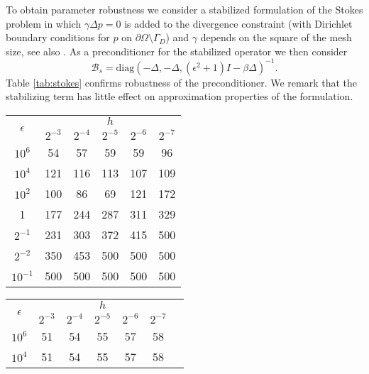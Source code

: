 \begin{example}
  To obtain parameter robustness we consider a stabilized formulation
  of the Stokes problem in which $\gamma \Delta p = 0$ is added to the
  divergence constraint (with Dirichlet boundary conditions for $p$ on
  $\partial\Omega\setminus \Gamma_D$) and $\gamma$ depends on the square
  of the mesh size, see also \cite[\S 7]{mardal2011preconditioning}. As
  a preconditioner for the stabilized operator we then consider
  \[
  \mathcal{B}_s=\text{diag}(-\Delta, -\Delta, (\epsilon^2+1)I-\beta\Delta)^{-1}.
  \]
  Table \ref{tab:stokes} confirms robustness of the preconditioner. We remark
  that the stabilizing term has little effect on approximation properties
  of the formulation.

  \begin{table}
      \scriptsize{
    \begin{minipage}{0.49\textwidth}
  \begin{center}
    \begin{tabular}{c|ccccc}
      \hline
      \multirow{2}{*}{$\epsilon$} & \multicolumn{5}{c}{$h$}\\
      \cline{2-6}
 &   $2^{-3}$  & $2^{-4}$ & $2^{-5}$ & $2^{-6}$ & $2^{-7}$  \\  
\hline
$10^{6}$ & 54 & 57 & 59 & 59 & 96\\
$10^{4}$ & 121 & 116 & 113 & 107 & 109\\
$10^{2}$ & 100 & 86 & 69 & 121 & 172\\
1 & 177 & 244 & 287 & 311 & 329\\
$2^{-1}$ & 231 & 303 & 372 & 415 & 500\\
$2^{-2}$ & 350 & 453 & 500 & 500 & 500\\
$10^{-1}$ & 500 & 500 & 500 & 500 & 500\\
\hline
  \end{tabular}
  \end{center}
  \end{minipage}
      }
            \scriptsize{
    \begin{minipage}{0.49\textwidth}
  \begin{center}
    \begin{tabular}{c|cccccc}
      \hline
      \multirow{2}{*}{$\epsilon$} & \multicolumn{5}{c}{$h$}\\
      \cline{2-6}
 &   $2^{-3}$  & $2^{-4}$ & $2^{-5}$ & $2^{-6}$ & $2^{-7}$  \\  
\hline
$10^{6}$ & 51 & 54 & 55 & 57 & 58\\
$10^{4}$ & 51 & 54 & 55 & 57 & 58\\

\end{tabular}
\end{center}
\end{minipage}}
\end{table}
\end{example}
